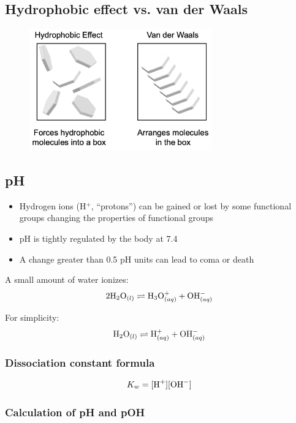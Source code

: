 \documentclass[letterpaper, 12pt]{article}
\begin{document}
\subsection*{Hydrophobic effect vs. van der Waals}

\begin{figure}[H]
\centering
\includegraphics[width=0.7\textwidth]{hydrophobicvsvdw}
\end{figure}

\subsection*{pH}

\begin{itemize}
\item Hydrogen ions (H$^+$, ``protons'') can be gained or lost by some functional groups changing the properties of functional groups
\item pH is tightly regulated by the body at 7.4
\item A change greater than 0.5 pH units can lead to coma or death
\end{itemize}

A small amount of water ionizes: $$2 \ce{H2O}_{(l)} \rightleftharpoons  \ce{H3O+}_{(aq)} + \ce{OH-}_{(aq)}$$

For simplicity: $$\ce{H2O}_{(l)} \rightleftharpoons \ce{H+}_{(aq)} + \ce{OH-}_{(aq)}$$

\subsubsection*{Dissociation constant formula}

\begin{equation}
K_w = [\ce{H+}][\ce{OH-}]
\end{equation}

\subsubsection*{Calculation of pH and pOH}
\end{document}
